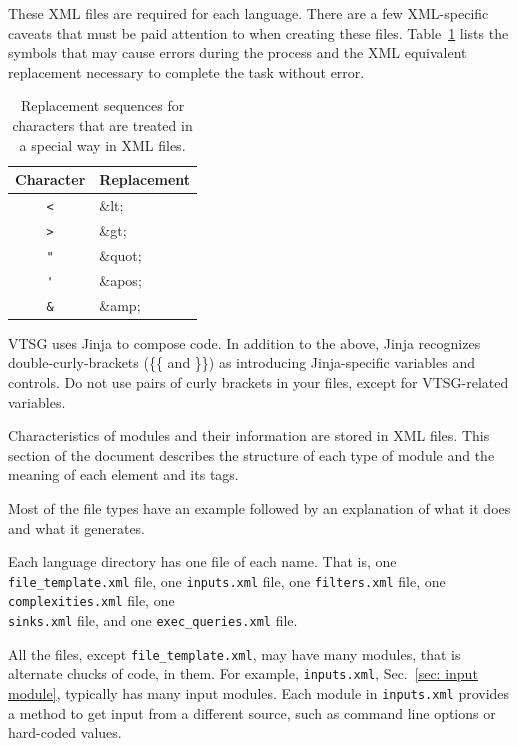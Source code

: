 \documentclass[12pt]{article}
\begin{document}
These XML files are required for each language.
There 
are a few XML-specific caveats that must be paid attention to when 
creating these files. 
Table~\ref{tab:XML escapes} lists the symbols that may cause errors 
during the process and the XML equivalent replacement necessary to 
complete the
task without error.

\begin{table}[H]
\centering
\caption{Replacement sequences for characters that are treated 
in a special way in XML files.}
\begin{tabular}{|c|l|}
\hline
\textbf{Character} & \textbf{Replacement} \\
\hline
 \verb|<| & \&lt; \\
\hline
 \verb|>| & \&gt; \\
\hline
 \verb|"| & \&quot; \\
\hline
 \verb|'| & \&apos; \\
\hline
 \verb|&| & \&amp; \\
\hline
\end{tabular}
\label{tab:XML escapes}
\end{table}

VTSG uses Jinja to compose code. In addition to the above, Jinja recognizes
double-curly-brackets (\{\{ and \}\}) as introducing Jinja-specific variables and
controls.  Do not use pairs of curly brackets in your files, except for VTSG-related
variables.

Characteristics of modules and their information are stored in 
XML files.  
This section of the document describes the structure of each type of module and
the meaning
of each element and its tags.

Most of the file types have an example followed by
an explanation of what it does and what it generates.

Each language directory has one file of each name. That is,
one \verb|file_template.xml| file, one \verb|inputs.xml| file,
one \verb|filters.xml| file, one \verb|complexities.xml| file,
one \\ \verb|sinks.xml| file, and one \verb|exec_queries.xml| file.

All the files, except \verb|file_template.xml|, may have many
modules, that is alternate chucks of code, in them.
For example, \verb|inputs.xml|, Sec.~\ref{sec: input module}, typically has many input
modules.  Each module in \verb|inputs.xml| provides a method to get input from a
different source, such as command line options or hard-coded values.
\end{document}
